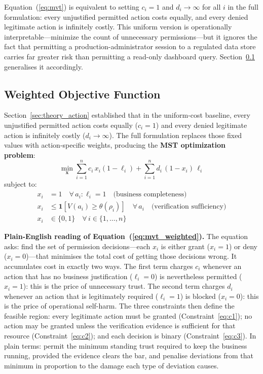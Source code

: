 \documentclass[acmlarge]{acmart}
\begin{document}
Equation~(\ref{eq:mvt}) is equivalent to setting $c_i = 1$ and $d_i \to \infty$
for all $i$ in the full formulation: every unjustified permitted action costs equally,
and every denied legitimate action is infinitely costly. This uniform version is
operationally interpretable---minimize the count of unnecessary permissions---but it
ignores the fact that permitting a production-administrator session to a regulated
data store carries far greater risk than permitting a read-only dashboard query.
Section~\ref{sec:theory_weighted} generalises it accordingly.

\subsection{Weighted Objective Function}
\label{sec:theory_weighted}

Section~\ref{sec:theory_action} established that in the uniform-cost baseline, every unjustified
permitted action costs equally ($c_i = 1$) and every denied legitimate action is
infinitely costly ($d_i \to \infty$). The full formulation replaces those fixed
values with action-specific weights, producing the \textbf{MST optimization problem}:
\begin{equation}
\min_{\mathbf{x}} \sum_{i=1}^{n} c_i\, x_i (1 - \ell_i)
+ \sum_{i=1}^{n} d_i\, (1 - x_i)\, \ell_i
\label{eq:mvt_weighted}
\end{equation}
subject to:
\begin{align}
x_i &= 1 \quad \forall\, a_i : \ell_i = 1 \quad \text{(business completeness)}
\label{eq:c1} \\
x_i &\leq \mathbf{1}[V(a_i) \geq \theta(\rho_i)] \quad \forall\, a_i
\quad \text{(verification sufficiency)}
\label{eq:c2} \\
x_i &\in \{0,1\} \quad \forall\, i \in \{1,\ldots,n\}
\label{eq:c3}
\end{align}

\textbf{Plain-English reading of Equation~(\ref{eq:mvt_weighted}).}
The equation asks: find the set of permission decisions---each $x_i$ is either
grant ($x_i = 1$) or deny ($x_i = 0$)---that minimises the total cost of
getting those decisions wrong. It accumulates cost in exactly two ways. The first
term charges $c_i$ whenever an action that has no business justification
($\ell_i = 0$) is nevertheless permitted ($x_i = 1$): this is the price of
unnecessary trust. The second term charges $d_i$ whenever an action that is
legitimately required ($\ell_i = 1$) is blocked ($x_i = 0$): this is the price of
operational self-harm. The three constraints then define the feasible region: every
legitimate action must be granted (Constraint~\ref{eq:c1}); no action may be
granted unless the verification evidence is sufficient for that resource
(Constraint~\ref{eq:c2}); and each decision is binary (Constraint~\ref{eq:c3}).
In plain terms: permit the minimum standing trust required to keep the business
running, provided the evidence clears the bar, and penalise deviations from that
minimum in proportion to the damage each type of deviation causes.
\end{document}
